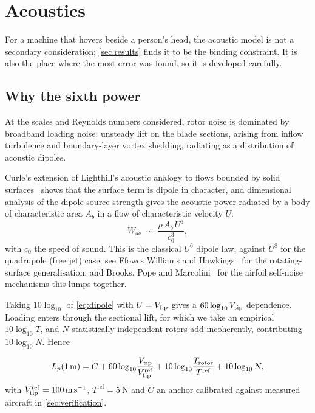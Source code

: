 ﻿\section{Acoustics}
\label{sec:acoustics}

For a machine that hovers beside a person's head, the acoustic model is not a
secondary consideration; \cref{sec:results} finds it to be the binding
constraint. It is also the place where the most error was found, so it is
developed carefully.

\subsection{Why the sixth power}

\begin{model}
\label{mod:acoustic}
At the scales and Reynolds numbers considered, rotor noise is dominated by
broadband loading noise: unsteady lift on the blade sections, arising from
inflow turbulence and boundary-layer vortex shedding, radiating as a
distribution of acoustic dipoles.
\end{model}

Curle's extension of Lighthill's acoustic analogy to flows bounded by solid
surfaces~\cite{lighthill1952,curle1955} shows that the surface term is dipole
in character, and dimensional analysis of the dipole source strength gives the
acoustic power radiated by a body of characteristic area $A_b$ in a flow of
characteristic velocity $U$:
\begin{equation}
  W_{\mathrm{ac}} \;\sim\; \frac{\rho\, A_b\, U^{6}}{c_0^{3}} ,
  \label{eq:dipole}
\end{equation}
with $c_0$ the speed of sound. This is the classical $U^6$ dipole law, against
$U^8$ for the quadrupole (free jet) case; see Ffowcs Williams and
Hawkings~\cite{fwh1969} for the rotating-surface generalisation, and
Brooks, Pope and Marcolini~\cite{brooks1989} for the airfoil self-noise
mechanisms this lumps together.

Taking $10\log_{10}$ of \cref{eq:dipole} with $U=V_{\mathrm{tip}}$ gives a
$60\log_{10}V_{\mathrm{tip}}$ dependence. Loading enters through the sectional lift, for
which we take an empirical $10\log_{10}T$, and $N$ statistically independent
rotors add incoherently, contributing $10\log_{10}N$. Hence

\begin{model}
\label{mod:spl}
\begin{equation}
  L_p(\SI{1}{\metre})
  = C + 60\log_{10}\!\frac{V_{\mathrm{tip}}}{V_{\mathrm{tip}}^{\mathrm{ref}}}
      + 10\log_{10}\!\frac{T_{\mathrm{rotor}}}{T^{\mathrm{ref}}}
      + 10\log_{10} N ,
  \label{eq:splmodel}
\end{equation}
with $V_{\mathrm{tip}}^{\mathrm{ref}}=\SI{100}{\metre\per\second}$,
$T^{\mathrm{ref}}=\SI{5}{\newton}$ and $C$ an anchor calibrated against
measured aircraft in \cref{sec:verification}.
\end{model}

